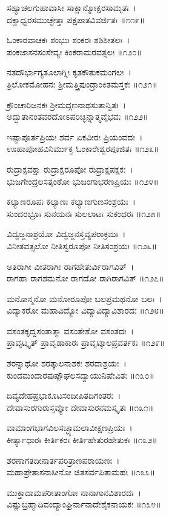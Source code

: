 ಸಹ್ಯಾಚಲಗುಹಾವಾಸೀ ಸಾಕ್ಷಾನ್ಮೋಕ್ಷರಸಾಮೃತಃ~।\\
ದಕ್ಷಾಧ್ವರಸಮುಚ್ಛೇತ್ತಾ ಪಕ್ಷಪಾತವಿವರ್ಜಿತಃ ॥೧೧೯॥

	ಓಂಕಾರವಾಚಕಃ ಶಂಭುಃ ಶಂಕರಃ ಶಶಿಶೀತಲಃ~।\\
	ಪಂಕಜಾಸನಸಂಸೇವ್ಯಃ ಕಿಂಕರಾಮರವತ್ಸಲಃ ॥೧೨೦॥

ನತದೌರ್ಭಾಗ್ಯತೂಲಾಗ್ನಿಃ ಕೃತಕೌತುಕಮಂಗಲಃ~।\\
ತ್ರಿಲೋಕಮೋಹನಃ ಶ್ರೀಮತ್ತ್ರಿಪುಂಡ್ರಾಂಕಿತಮಸ್ತಕಃ ॥೧೨೧॥

	ಕ್ರೌಂಚಾರಿಜನಕಃ ಶ್ರೀಮದ್ಗಣನಾಥಸುತಾನ್ವಿತಃ~।\\
	ಅದ್ಭುತಾನಂತವರದೋಽಪರಿಚ್ಛಿನ್ನಾತ್ಮವೈಭವಃ ॥೧೨೨॥

ಇಷ್ಟಾಪೂರ್ತಪ್ರಿಯಃ ಶರ್ವ ಏಕವೀರಃ ಪ್ರಿಯಂವದಃ~।\\
ಊಹಾಪೋಹವಿನಿರ್ಮುಕ್ತ ಓಂಕಾರೇಶ್ವರಪೂಜಿತಃ ॥೧೨೩॥

	ರುದ್ರಾಕ್ಷವಕ್ಷಾ ರುದ್ರಾಕ್ಷರೂಪೋ ರುದ್ರಾಕ್ಷಪಕ್ಷಕಃ~।\\
	ಭುಜಗೇಂದ್ರಲಸತ್ಕಂಠೋ ಭುಜಂಗಾಭರಣಪ್ರಿಯಃ ॥೧೨೪॥

ಕಲ್ಯಾಣರೂಪಃ ಕಲ್ಯಾಣಃ ಕಲ್ಯಾಣಗುಣಸಂಶ್ರಯಃ~।\\
ಸುಂದರಭ್ರೂಃ ಸುನಯನಃ ಸುಲಲಾಟಃ ಸುಕಂಧರಃ ॥೧೨೫॥

	ವಿದ್ವಜ್ಜನಾಶ್ರಯೋ ವಿದ್ವಜ್ಜನಸ್ತವ್ಯಪರಾಕ್ರಮಃ~।\\
	ವಿನೀತವತ್ಸಲೋ ನೀತಿಸ್ವರೂಪೋ ನೀತಿಸಂಶ್ರಯಃ ॥೧೨೬॥

ಅತಿರಾಗೀ ವೀತರಾಗೀ ರಾಗಹೇತುರ್ವಿರಾಗವಿತ್~।\\
ರಾಗಹಾ ರಾಗಶಮನೋ ರಾಗದೋ ರಾಗಿರಾಗವಿತ್ ॥೧೨೭॥

	ಮನೋನ್ಮನೋ ಮನೋರೂಪೋ ಬಲಪ್ರಮಥನೋ ಬಲಃ~।\\
	ವಿದ್ಯಾಕರೋ ಮಹಾವಿದ್ಯೋ ವಿದ್ಯಾವಿದ್ಯಾವಿಶಾರದಃ ॥೧೨೮॥

ವಸಂತಕೃದ್ವಸಂತಾತ್ಮಾ ವಸಂತೇಶೋ ವಸಂತದಃ~।\\
ಪ್ರಾವೃಟ್ಕೃತ್ ಪ್ರಾವೃಡಾಕಾರಃ ಪ್ರಾವೃಟ್ಕಾಲಪ್ರವರ್ತಕಃ ॥೧೨೯॥

	ಶರನ್ನಾಥೋ ಶರತ್ಕಾಲನಾಶಕಃ ಶರದಾಶ್ರಯಃ~।\\
	ಕುಂದಮಂದಾರಪುಷ್ಪೌಘಲಸದ್ವಾಯುನಿಷೇವಿತಃ ॥೧೩೦॥

ದಿವ್ಯದೇಹಪ್ರಭಾಕೂಟಸಂದೀಪಿತದಿಗಂತರಃ~।\\
ದೇವಾಸುರಗುರುಸ್ತವ್ಯೋ ದೇವಾಸುರನಮಸ್ಕೃತಃ ॥೧೩೧॥

	ವಾಮಾಂಗಭಾಗವಿಲಸಚ್ಛ್ಯಾಮಲಾವೀಕ್ಷಣಪ್ರಿಯಃ~।\\
	ಕೀರ್ತ್ಯಾಧಾರಃ ಕೀರ್ತಿಕರಃ ಕೀರ್ತಿಹೇತುರಹೇತುಕಃ ॥೧೩೨॥

ಶರಣಾಗತದೀನಾರ್ತಪರಿತ್ರಾಣಪರಾಯಣಃ~।\\
ಮಹಾಪ್ರೇತಾಸನಾಸೀನೋ ಜಿತಸರ್ವಪಿತಾಮಹಃ ॥೧೩೩॥

	ಮುಕ್ತಾದಾಮಪರೀತಾಂಗೋ ನಾನಾಗಾನವಿಶಾರದಃ~।\\
	ವಿಷ್ಣುಬ್ರಹ್ಮಾದಿವಂದ್ಯಾಂಘ್ರಿರ್ನಾನಾದೇಶೈಕನಾಯಕಃ ॥೧೩೪॥

